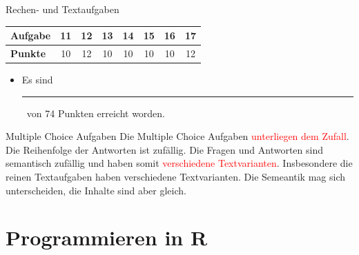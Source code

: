 \documentclass[a4paper, 9pt]{scrartcl}\usepackage[]{graphicx}\usepackage[]{xcolor}
\begin{document}
\begin{graybox}{Rechen- und Textaufgaben}
  \begin{center}
    \large
    \begin{tabular}{|l|c|c|c|c|c|c|c|}
      \hline
      \textbf{Aufgabe} & \textbf{11} & \textbf{12} & \textbf{13} & \textbf{14} & \textbf{15} & \textbf{16} & \textbf{17} \strut\\
      \hline
      \textbf{Punkte} & 
      \hspace{1Ex}\Large\textcolor{gray!70}{10}\hspace{1Ex}  & 
      \hspace{1Ex}\Large\textcolor{gray!70}{12}\hspace{1Ex}  & 
      \hspace{1Ex}\Large\textcolor{gray!70}{10}\hspace{1Ex}  & 
      \hspace{1Ex}\Large\textcolor{gray!70}{10}\hspace{1Ex}  & 
      \hspace{1Ex}\Large\textcolor{gray!70}{10}\hspace{1Ex}  & 
      \hspace{1Ex}\Large\textcolor{gray!70}{10}\hspace{1Ex}  & 
      \hspace{1Ex}\Large\textcolor{gray!70}{12}\hspace{1Ex} \strut\\
      \hline
  \end{tabular}
\end{center}
\begin{itemize}
\item Es sind \rule[0ex]{2em}{.4pt}\, von 74 Punkten erreicht worden.
\end{itemize}
\end{graybox}

\clearpage
\begin{graybox}{Multiple Choice Aufgaben}
Die Multiple Choice Aufgaben \textcolor{red}{unterliegen dem Zufall}. Die Reihenfolge der Antworten ist zufällig. Die Fragen und Antworten sind semantisch zufällig und haben somit \textcolor{red}{verschiedene Textvarianten}. Insbesondere die reinen Textaufgaben haben verschiedene Textvarianten. Die Semeantik mag sich unterscheiden, die Inhalte sind aber gleich.
\end{graybox}
\section*{Programmieren in R} 
\end{document}

